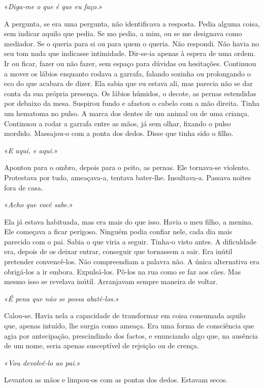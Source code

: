 «\emph{Diga­‑me o que é que eu faço.}»

A pergunta, se era uma pergunta, não identificava a resposta. Pedia
alguma coisa, sem indicar aquilo que pedia. Se mo pedia, a mim, ou se me
designava como mediador. Se o queria para si ou para quem o queria. Não
respondi. Não havia no seu tom nada que indicasse intimidade.
Dir­‑se­‑ia apenas à espera de uma ordem. Ir ou ficar, fazer ou não
fazer, sem espaço para dúvidas ou hesitações. Continuou a mover os
lábios enquanto rodava a garrafa, falando sozinha ou prolongando o eco
do que acabara de dizer. Ela sabia que eu estava ali, mas parecia não se
dar conta da sua própria presença. Os lábios húmidos, o decote, as
pernas estendidas por debaixo da mesa. Suspirou fundo e afastou o cabelo
com a mão direita. Tinha um hematoma no pulso. A marca dos dentes de um
animal ou de uma criança. Continuou a rodar a garrafa entre as mãos, já
sem olhar, fixando o pulso mordido. Massajou­‑o com a ponta dos dedos.
Disse que tinha sido o filho.

«\emph{E aqui, e aqui.}»

Apontou para o ombro, depois para o peito, as pernas. Ele tornava­‑se
violento. Protestava por tudo, ameaçava­‑a, tentava bater­‑lhe.
Insultava­‑a. Passava noites fora de casa.

«\emph{Acho que você sabe.}»

Ela já estava habituada, mas era mais do que isso. Havia o meu filho, a
menina. Ele começava a ficar perigoso. Ninguém podia confiar nele, cada
dia mais parecido com o pai. Sabia o que viria a seguir. Tinha­‑o visto
antes. A dificuldade era, depois de os deixar entrar, conseguir que
tornassem a sair. Era inútil pretender convencê­‑los. Não compreendiam a
palavra não. A única alternativa era obrigá­‑los a ir embora.
Expulsá­‑los. Pô­‑los na rua como se faz aos cães. Mas mesmo isso se
revelava inútil. Arranjavam sempre maneira de voltar.

«\emph{É pena que não se possa abatê­‑los.}»

Calou­‑se. Havia nela a capacidade de transformar em coisa consumada
aquilo que, apenas intuído, lhe surgia como ameaça. Era uma forma de
consciência que agia por antecipação, prescindindo dos factos, e
enunciando algo que, na ausência de um nome, seria apenas susceptível de
rejeição ou de crença.

«\emph{Vou devolvê­‑lo ao pai.}»

Levantou as mãos e limpou­‑os com as pontas dos dedos. Estavam secos.

